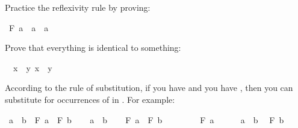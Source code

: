 \begin{isabellebody}
%
\endisatagproof
{\isafoldproof}%
%
\isadelimproof
%
\endisadelimproof
%
\begin{isamarkuptext}%
\begin{Exercise} Practice the reflexivity rule by proving: \end{Exercise}%
\end{isamarkuptext}\isamarkuptrue%
\isamarkupfalse%
\ {\isachardoublequoteopen}F\ a\ {\isasymlongrightarrow}\ a\ {\isacharequal}\ a{\isachardoublequoteclose}%
\isadelimproof
\ %
\endisadelimproof
%
\isatagproof
{}\isamarkupfalse%
%
\endisatagproof
{\isafoldproof}%
%
\isadelimproof
%
\endisadelimproof
%
\begin{isamarkuptext}%
\begin{Exercise} Prove that everything is identical to something: \end{Exercise}%
\end{isamarkuptext}\isamarkuptrue%
\isamarkupfalse%
\ {\isachardoublequoteopen}{\isasymforall}\ x{\isachardot}\ {\isasymexists}\ y{\isachardot}\ x\ {\isacharequal}\ y{\isachardoublequoteclose}%
\isadelimproof
\ %
\endisadelimproof
%
\isatagproof
{}\isamarkupfalse%
%
\endisatagproof
{\isafoldproof}%
%
\isadelimproof
%
\endisadelimproof
%
\isamarkuptrue%
%
\begin{isamarkuptext}%
According to the rule of substitution, if you have   and you have ,
then you can substitute  for occurrences of  in . For example:%
\end{isamarkuptext}\isamarkuptrue%
\isamarkupfalse%
\ {\isachardoublequoteopen}a\ {\isacharequal}\ b\ {\isasymlongrightarrow}\ F\ a\ {\isasymlongrightarrow}\ F\ b{\isachardoublequoteclose}\isanewline
%
\isadelimproof
%
\endisadelimproof
%
\isatagproof
{}\isamarkupfalse%
\isanewline
\ \ \isamarkupfalse%
\ {\isachardoublequoteopen}a\ {\isacharequal}\ b{\isachardoublequoteclose}\isanewline
\ \ \isamarkupfalse%
\ {\isachardoublequoteopen}F\ a\ {\isasymlongrightarrow}\ F\ b{\isachardoublequoteclose}\isanewline
\ \ \isamarkupfalse%
\isanewline
\ \ \ \ \isamarkupfalse%
\ {\isachardoublequoteopen}F\ a{\isachardoublequoteclose}\isanewline
\ \ \ \ \isamarkupfalse%
\ {\isacharbackquoteopen}a\ {\isacharequal}\ b{\isacharbackquoteclose}\ \isamarkupfalse%
\ {\isachardoublequoteopen}F\ b{\isachardoublequoteclose}\ \isamarkupfalse%

\end{isabellebody}
